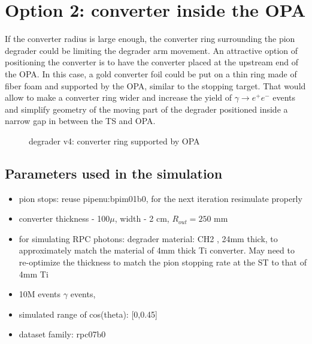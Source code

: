 %
\section{Option 2: converter inside the OPA}
\label{section:geometry_v4}
If the converter radius is large enough, the converter ring surrounding the pion degrader
could be limiting the degrader arm movement. 
An attractive option of positioning the converter is to have the converter placed 
at the upstream end of the OPA. In this case, a gold converter foil could be put
on a thin ring made of fiber foam and supported by the OPA, similar to the stopping target.
That would allow to make a converter ring wider and increase the yield of $\gamma \to e^+e^-$
events and simplify geometry of the moving part of the degrader positioned inside
a narrow gap in between the TS and OPA.

\begin{figure}[H]
  \caption{
    \label{figure:degrader_v4}
    degrader v4: converter ring supported by OPA
  }
\end{figure}

\subsection{Parameters used in the simulation}

\begin{itemize}
\item
  pion stops: reuse pipenu:bpim01b0, for the next iteration resimulate properly
\item
  converter thickness - 100$\mu$, width - 2 cm, $R_{out} = 250$ mm
\item 
  for simulating RPC photons: degrader material: CH2 , 24mm thick,
  to approximately match the material of 4mm thick Ti converter.
  May need to re-optimize the thickness to match the pion stopping rate
  at the ST to that of 4mm Ti
\item
  10M events $\gamma$ events, 
\item
  simulated range of cos(theta): [0,0.45] 
\item
  dataset family: rpc07b0
\end{itemize}

